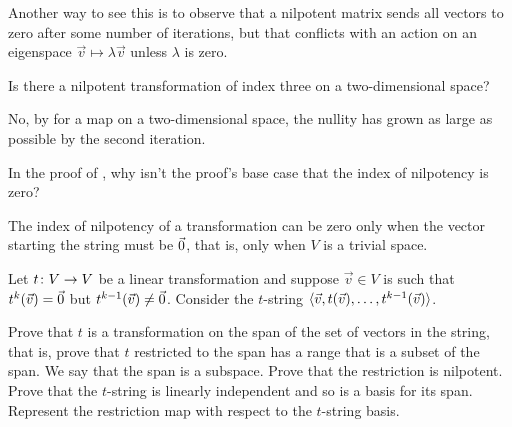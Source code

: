 \begin{exercises}
\begin{answer}
      Another way to see this is to observe that a nilpotent matrix sends all
      vectors to zero after some number of iterations, but that conflicts 
      with an action on an eigenspace $\vec{v}\mapsto \lambda\vec{v}$ unless
      $\lambda$ is zero.
    \end{answer}
  \item 
    Is there a nilpotent transformation of index three on a
    two-dimensional space?
    \begin{answer}
      No, by  for a map on a 
      two-dimensional space, the nullity has grown
      as large as possible by the second iteration.
    \end{answer}
  \item 
    In the proof of , why isn't the
    proof's base case that the index of nilpotency is zero?
    \begin{answer}
      The index of nilpotency of a transformation can be zero only when the 
      vector starting the string
      must be $\vec{0}$, that is, only when $V$ is a trivial space.
    \end{answer}
  \recommended \item
    Let \( \mbox{$t\colon V\to V$} \) be a linear transformation and suppose
    \( \vec{v}\in V \)  is such that \( t^k(\vec{v})=\vec{0} \) but
    \( t^{k-1}(\vec{v})\neq\vec{0} \).
    Consider the $t$-string 
    $\langle\vec{v},t(\vec{v}),\dots,t^{k-1}(\vec{v})\rangle$.
    \begin{exparts}
      \partsitem Prove that \( t \) is a transformation on the span of the set
        of vectors in the string,
        that is, prove that \( t \) restricted to the span has a range
        that is a subset of the span.
        We say that the span is a  
        subspace.
      \partsitem Prove that the restriction is nilpotent.
      \partsitem Prove that the $t$-string
        is linearly independent and so is a basis for its span.
      \partsitem Represent the restriction map with respect to the 
        $t$-string basis.
    \end{exparts}
    \begin{answer}
\end{answer}
\end{exercises}
